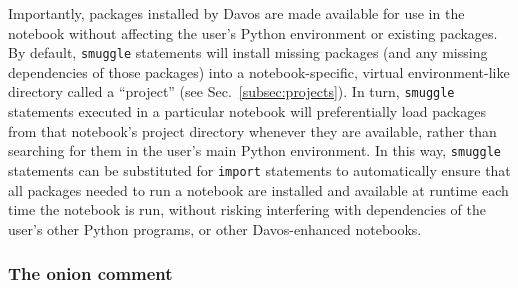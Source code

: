 \documentclass[preprint,12pt,a4paper]{elsarticle}
\begin{document}
Importantly, packages installed by Davos are made available for use in the
notebook without affecting the user's Python environment or existing packages.
By default, \texttt{smuggle} statements will install missing packages (and any
missing dependencies of those packages) into a notebook-specific, virtual
environment-like directory called a ``project'' (see
Sec.~\ref{subsec:projects}). In turn, \texttt{smuggle} statements executed in a
particular notebook will preferentially load packages from that notebook's
project directory whenever they are available, rather than searching for them
in the user's main Python environment. In this way, \texttt{smuggle}
statements can be substituted for \texttt{import} statements to automatically
ensure that all packages needed to run a notebook are installed and available
at runtime each time the notebook is run, without risking interfering with
dependencies of the user's other Python programs, or other Davos-enhanced
notebooks.


\subsubsection{The onion comment}\label{subsec:onion}
\end{document}
